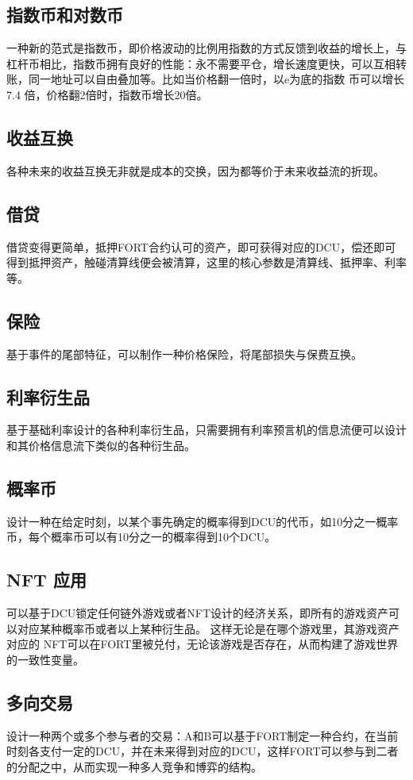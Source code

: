 \documentclass[letterpaper,11pt]{ctexart}
\begin{document}
\subsection{指数币和对数币}
一种新的范式是指数币，即价格波动的比例用指数的方式反馈到收益的增长上，与杠杆币相比，指数币拥有良好的性能：永不需要平仓，增长速度更快，可以互相转账，同一地址可以自由叠加等。比如当价格翻一倍时，以e为底的指数 币可以增长 7.4 倍，价格翻2倍时，指数币增长20倍。

\subsection{收益互换}
各种未来的收益互换无非就是成本的交换，因为都等价于未来收益流的折现。

\subsection{借贷}
借贷变得更简单，抵押FORT合约认可的资产，即可获得对应的DCU，偿还即可得到抵押资产，触碰清算线便会被清算，这里的核心参数是清算线、抵押率、利率等。

\subsection{保险}
基于事件的尾部特征，可以制作一种价格保险，将尾部损失与保费互换。

\subsection{利率衍生品}
基于基础利率设计的各种利率衍生品，只需要拥有利率预言机的信息流便可以设计和其价格信息流下类似的各种衍生品。

\subsection{概率币}
设计一种在给定时刻，以某个事先确定的概率得到DCU的代币，如10分之一概率币，每个概率币可以有10分之一的概率得到10个DCU。

\subsection{NFT 应用}
可以基于DCU锁定任何链外游戏或者NFT设计的经济关系，即所有的游戏资产可以对应某种概率币或者以上某种衍生品。
这样无论是在哪个游戏里，其游戏资产对应的 NFT可以在FORT里被兑付，无论该游戏是否存在，从而构建了游戏世界的一致性变量。

\subsection{多向交易}
设计一种两个或多个参与者的交易：A和B可以基于FORT制定一种合约，在当前时刻各支付一定的DCU，并在未来得到对应的DCU，这样FORT可以参与到二者的分配之中，从而实现一种多人竞争和博弈的结构。
\end{document}
